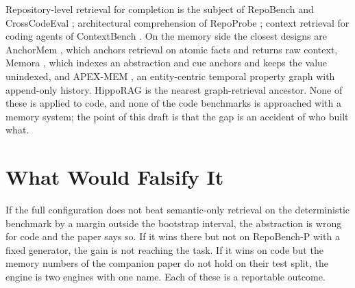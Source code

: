 \documentclass[11pt]{article}
\begin{document}
Repository-level retrieval for completion is the subject of RepoBench
\cite{repobench} and CrossCodeEval \cite{crosscodeeval}; architectural
comprehension of RepoProbe \cite{repoprobe}; context retrieval for coding
agents of ContextBench \cite{contextbench}. On the memory side the closest
designs are AnchorMem \cite{anchormem}, which anchors retrieval on atomic
facts and returns raw context, Memora \cite{memora}, which indexes an
abstraction and cue anchors and keeps the value unindexed, and APEX-MEM
\cite{apexmem}, an entity-centric temporal property graph with append-only
history. HippoRAG \cite{hipporag} is the nearest graph-retrieval ancestor.
None of these is applied to code, and none of the code benchmarks is
approached with a memory system; the point of this draft is that the gap is
an accident of who built what.

\section{What Would Falsify It}

If the full configuration does not beat semantic-only retrieval on the
deterministic benchmark by a margin outside the bootstrap interval, the
abstraction is wrong for code and the paper says so. If it wins there but
not on RepoBench-P with a fixed generator, the gain is not reaching the
task. If it wins on code but the memory numbers of the companion paper do
not hold on their test split, the engine is two engines with one name.
Each of these is a reportable outcome.
\end{document}
